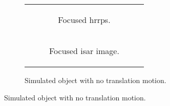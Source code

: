 \documentclass[class=report,11pt,crop=false]{standalone}
\begin{document}
\begin{figure}[h]
\begin{minipage}{0.30\linewidth}
\begin{figure}
\begin{tabular}{@{}c@{}}
                    \begin{subfigure}{\linewidth}
                        \centering
                        \resizebox{\linewidth}{!}{}
                        \caption{Focused \gls{hrrp}s.\label{subfig:sim_hrrp_0mps}}
                    \end{subfigure}
                    \\
                    \begin{subfigure}{\linewidth}
                        \centering
                        \resizebox{\linewidth}{!}{}
                        \caption{Focused \gls{isar} image.\label{subfig:sim_isar_0mps}}
                    \end{subfigure}
                \end{tabular}
                \caption{Simulated object with no translation motion. \label{fig:sim_0mps}}
            \end{figure}
        \end{minipage}
    \end{figure}
    
\end{document}
